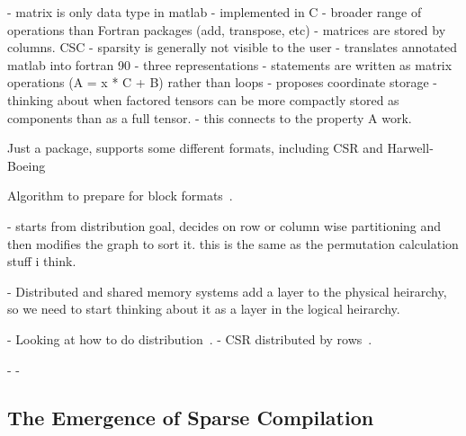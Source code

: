 \cite{shahnaz2005review}


\cite{duff1989sparse}
\cite{floridasparsematrixsuite}
\cite{splatt}



\cite{gilbert1992sparse}
- matrix is only data type in matlab
- implemented in C
- broader range of operations than Fortran packages (add, transpose, etc)
- matrices are stored by columns. CSC
- sparsity is generally not visible to the user
\cite{kawabata2004matlab}
- translates annotated matlab into fortran 90
- three representations
- statements are written as matrix operations (A = x * C + B) rather than loops
\cite{bader2008efficient}
- proposes coordinate storage
- thinking about when factored tensors can be more compactly stored as components than as a full tensor.
- this connects to the property A work.

Just a package, supports some different formats, including CSR and Harwell-Boeing~\cite{koenker2003sparsem}


Algorithm to prepare for block formats~\cite{pothen1990computing}.

\cite{catalyurek1999hypergraph}
- starts from distribution goal, decides on row or column wise partitioning and then modifies the graph to sort it. this is the same as the permutation calculation stuff i think.



- Distributed and shared memory systems add a layer to the physical heirarchy, so we need to start thinking about it as a layer in the logical heirarchy. %

- Looking at how to do distribution~\cite{ogielski1993sparse}.
- CSR distributed by rows~\cite{erhel1995parallel}.

- 
\cite{filippone2000psblas}
- 

\cite{bouaricha1994tensor} 
\cite{bouaricha1999tensor}
\cite{lin2002efficient}
\cite{kolda2008scalable}

\cite{irwin1997aspect}
\cite{hackbusch1999sparse}
\cite{ashcraft1999spooles}


\subsection{The Emergence of Sparse Compilation}


